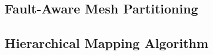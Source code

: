 \documentclass[sigconf, screen, review]{acmart}
\begin{document}

\subsection{Fault-Aware Mesh Partitioning}
\label{sec:partitioning}





\subsection{Hierarchical Mapping Algorithm}
\label{sec:algorithm}

\end{document}
